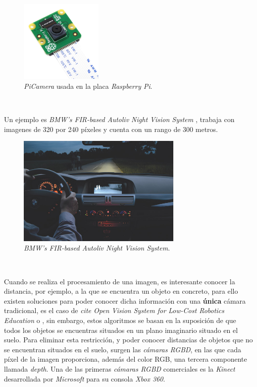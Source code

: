 \begin{figure} [h!]
	\begin{center}
		\includegraphics[width=4cm]{figs/picamera}
	\end{center}
	\caption{\textit{PiCamera} usada en la placa \textit{Raspberry Pi}.}
	\label{fig:picamera}
\end{figure}\

Un ejemplo es \textit{BMW's FIR-based Autoliv Night Vision System} \cite{nightvision}, trabaja con imagenes de 320 por 240 píxeles y cuenta con un rango de 300 metros.\\

\begin{figure} [h!]
	\begin{center}
		\includegraphics[width=8cm]{figs/nightvision}
	\end{center}
	\caption{\textit{BMW's FIR-based Autoliv Night Vision System}.}
	\label{fig:nightvision}
\end{figure}\

Cuando se realiza el procesamiento de una imagen, es interesante conocer la distancia, por ejemplo, a la que se encuentra un objeto en concreto, para ello existen soluciones para poder conocer dicha información con una \textbf{única} cámara tradicional, es el caso de \textit{cite Open Vision System for Low-Cost Robotics Education} o \cite{distanceopencv}, sin embargo, estos algoritmos se basan en la suposición de que todos los objetos se encuentras situados en un plano imaginario situado en el suelo. Para eliminar esta restricción, y poder conocer distancias de objetos que no se encuentran situados en el suelo, surgen las \textit{cámaras RGBD}, en las que cada píxel de la imagen proporciona, además del color RGB, una tercera componente llamada \textit{depth}. Una de las primeras \textit{cámaras RGBD} comerciales es la \textit{Kinect} desarrollada por \textit{Microsoft} para su consola \textit{Xbox 360}.\\

